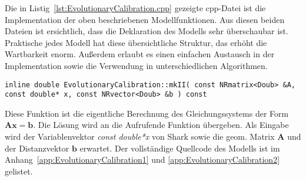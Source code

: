 %
%

%
Die in Listig~\ref{lst:EvolutionaryCalibration.cpp} gezeigte cpp-Datei ist die Implementation der oben beschriebenen Modellfunktionen. Aus diesen beiden Dateien ist ersichtlich, dass die Deklaration des Modells sehr überschaubar ist. Praktische jedes Modell hat diese übersichtliche Struktur, das erhöht die Wartbarkeit enorm. Außerdem erlaubt es einen einfachen Austausch in der Implementation sowie die Verwendung in unterschiedlichen Algorithmen. 
%
\begin{lstlisting}[label=EvolutionaryCalibration_4]
inline double EvolutionaryCalibration::mkII( const NRmatrix<Doub> &A, const double* x, const NRvector<Doub> &b ) const
\end{lstlisting}
%
Diese Funktion ist die eigentliche Berechnung des Gleichungssystems der Form $\mathbf{A}\mathbf{x}=\textbf{b}$. Die Lösung wird an die Aufrufende Funktion übergeben. Als Eingabe wird der Variablenvektor \textit{const double*x} von Shark sowie die geom. Matrix $\mathbf{A}$ und der Distanzvektor $\mathbf{b}$ erwartet.
%
Der vollständige Quellcode des Modells ist im Anhang~\ref{app:EvolutionaryCalibration1} und \ref{app:EvolutionaryCalibration2} gelistet.
%
%

%
%
